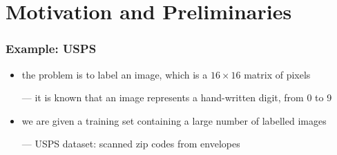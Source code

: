 \section[Preliminaries]{Motivation and Preliminaries}

\begin{frame}\frametitle{Example: USPS}

\begin{itemize}

\item the problem is to label an image, which is a $16\times16$ matrix of pixels

--- it is known that an image represents a hand-written
digit, from 0 to 9

\item we are given a training set containing a large
number of labelled images

--- USPS dataset: scanned zip codes from envelopes

\end{itemize}
\end{frame}













